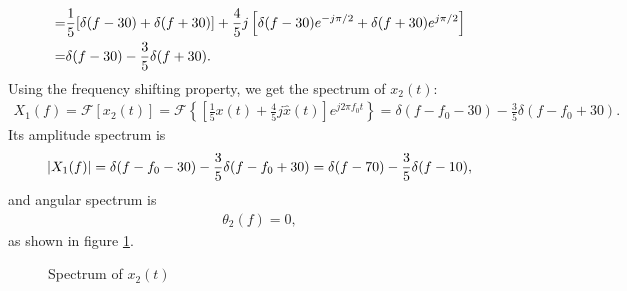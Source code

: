 \documentclass{assignment}
\begin{document}
\begin{sol}
\begin{itemize}
\begin{itemize}
\begin{align}
                \notag=&\frac{1}{5}[\delta(f-30)+\delta(f+30)]+\frac{4}{5}j\left[\delta(f-30)e^{-j\pi/2}+\delta(f+30)e^{j\pi/2}\right]\\
                =&\delta(f-30)-\frac{3}{5}\delta(f+30).
            \end{align}
            Using the frequency shifting property, we get the spectrum of $x_2(t)$:
            \begin{align}
                X_1(f)=\mathscr{F}[x_2(t)]=\mathscr{F}\left\{\left[\frac{1}{5}x(t)+\frac{4}{5}j\hat{x}(t)\right]e^{j2\pi f_0t}\right\}=\delta(f-f_0-30)-\frac{3}{5}\delta(f-f_0+30).
            \end{align}
            Its amplitude spectrum is
            \begin{align}
                \left\lvert X_1(f)\right\rvert=\delta(f-f_0-30)-\frac{3}{5}\delta(f-f_0+30)=\delta(f-70)-\frac{3}{5}\delta(f-10),
            \end{align}
            and angular spectrum is
            \begin{align}
                \theta_2(f)=0,
            \end{align}
            as shown in figure \ref{7-X2}.
			\begin{figure}[h]
                \centering
                \caption{Spectrum of $x_2(t)$}
                \label{7-X2}
            \end{figure}
        \end{itemize}
    \end{itemize}
\end{sol}
\end{document}
